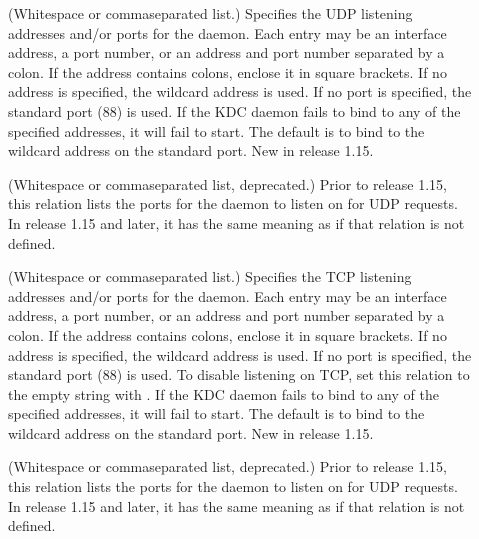 \documentclass[letterpaper,10pt,english]{sphinxmanual}
\begin{document}
\begin{description}
\item[{}] \leavevmode
\sphinxAtStartPar
(Whitespace\sphinxhyphen{} or comma\sphinxhyphen{}separated list.)  Specifies the UDP
listening addresses and/or ports for the {\hyperref[\detokenize{admin/admin_commands/krb5kdc:krb5kdc-8}]{}} daemon.
Each entry may be an interface address, a port number, or an
address and port number separated by a colon.  If the address
contains colons, enclose it in square brackets.  If no address is
specified, the wildcard address is used.  If no port is specified,
the standard port (88) is used.  If the KDC daemon fails to bind
to any of the specified addresses, it will fail to start.  The
default is to bind to the wildcard address on the standard port.
New in release 1.15.

\item[{}] \leavevmode
\sphinxAtStartPar
(Whitespace\sphinxhyphen{} or comma\sphinxhyphen{}separated list, deprecated.)  Prior to
release 1.15, this relation lists the ports for the
{\hyperref[\detokenize{admin/admin_commands/krb5kdc:krb5kdc-8}]{}} daemon to listen on for UDP requests.  In
release 1.15 and later, it has the same meaning as 
if that relation is not defined.

\item[{}] \leavevmode
\sphinxAtStartPar
(Whitespace\sphinxhyphen{} or comma\sphinxhyphen{}separated list.)  Specifies the TCP
listening addresses and/or ports for the {\hyperref[\detokenize{admin/admin_commands/krb5kdc:krb5kdc-8}]{}} daemon.
Each entry may be an interface address, a port number, or an
address and port number separated by a colon.  If the address
contains colons, enclose it in square brackets.  If no address is
specified, the wildcard address is used.  If no port is specified,
the standard port (88) is used.  To disable listening on TCP, set
this relation to the empty string with .
If the KDC daemon fails to bind to any of the specified addresses,
it will fail to start.  The default is to bind to the wildcard
address on the standard port.  New in release 1.15.

\item[{}] \leavevmode
\sphinxAtStartPar
(Whitespace\sphinxhyphen{} or comma\sphinxhyphen{}separated list, deprecated.)  Prior to
release 1.15, this relation lists the ports for the
{\hyperref[\detokenize{admin/admin_commands/krb5kdc:krb5kdc-8}]{}} daemon to listen on for UDP requests.  In
release 1.15 and later, it has the same meaning as
 if that relation is not defined.


\end{description}
\end{document}
